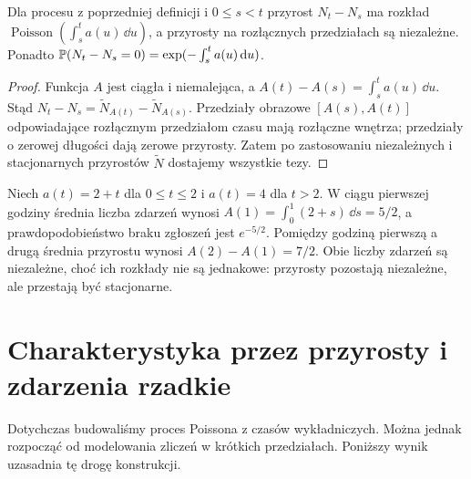 \begin{stwierdzenie}
Dla procesu z poprzedniej definicji i $0\le s<t$ przyrost
$N_t-N_s$ ma rozkład
$\operatorname{Poisson}(\int_s^t a(u)\,\dd u)$, a przyrosty
na rozłącznych przedziałach są niezależne. Ponadto
$\mathbb{P}(N_t-N_s=0)=\exp(-\int_s^t a(u)\,\mathrm{d} u)$.
\end{stwierdzenie}
\begin{proof}
Funkcja $A$ jest ciągła i niemalejąca, a
$A(t)-A(s)=\int_s^t a(u)\,\dd u$.
Stąd $N_t-N_s=\widetilde N_{A(t)}-\widetilde N_{A(s)}$.
Przedziały obrazowe $[A(s),A(t)]$ odpowiadające rozłącznym
przedziałom czasu mają rozłączne wnętrza; przedziały o
zerowej długości dają zerowe przyrosty. Zatem po zastosowaniu
niezależnych i stacjonarnych przyrostów $\widetilde N$
dostajemy wszystkie tezy.
\end{proof}

\begin{przyklad}
Niech $a(t)=2+t$ dla $0\le t\le2$ i $a(t)=4$ dla $t>2$.
W ciągu pierwszej godziny średnia liczba zdarzeń wynosi
$A(1)=\int_0^1(2+s)\,\dd s=5/2$,
a prawdopodobieństwo braku zgłoszeń jest $e^{-5/2}$.
Pomiędzy godziną pierwszą a drugą średnia przyrostu
wynosi $A(2)-A(1)=7/2$. Obie liczby zdarzeń są niezależne,
choć ich rozkłady nie są jednakowe: przyrosty pozostają
niezależne, ale przestają być stacjonarne.
\end{przyklad}

\section{Charakterystyka przez przyrosty i zdarzenia rzadkie}
Dotychczas budowaliśmy proces Poissona z czasów wykładniczych.
Można jednak rozpocząć od modelowania zliczeń w krótkich
przedziałach. Poniższy wynik uzasadnia tę drogę konstrukcji.

